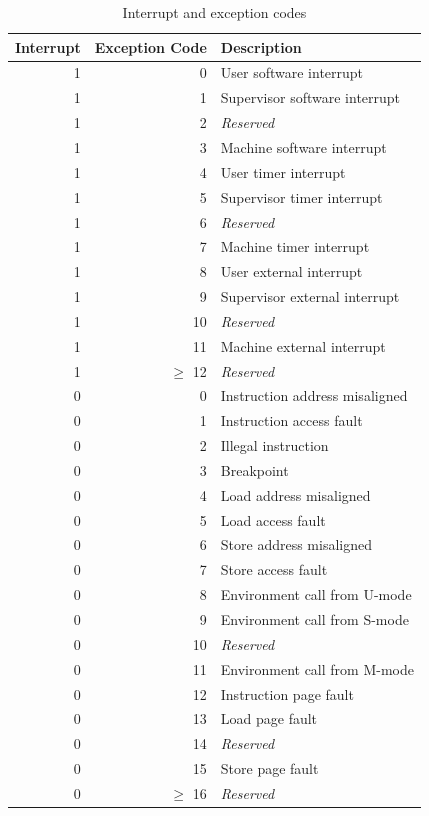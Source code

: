 \begin{table}
    \centering
    \begin{tabular}{| r | r | l |}
        \hline
        Interrupt & Exception Code & Description \\
        \hline
        1 & 0 & User software interrupt \\
        1 & 1 & Supervisor software interrupt \\
        1 & 2 & \textit{Reserved} \\
        1 & 3 & Machine software interrupt \\
        \hline
        1 & 4 & User timer interrupt \\
        1 & 5 & Supervisor timer interrupt \\
        1 & 6 & \textit{Reserved} \\
        1 & 7 & Machine timer interrupt \\
        \hline
        1 & 8 & User external interrupt \\
        1 & 9 & Supervisor external interrupt \\
        1 & 10 & \textit{Reserved} \\
        1 & 11 & Machine external interrupt \\
        \hline
        1 & $ \geq $ 12 & \textit{Reserved} \\
        \hline
        0 & 0 & Instruction address misaligned \\
        0 & 1 & Instruction access fault \\
        0 & 2 & Illegal instruction \\
        0 & 3 & Breakpoint \\
        0 & 4 & Load address misaligned \\
        0 & 5 & Load access fault \\
        0 & 6 & Store \textelp{} address misaligned \\
        0 & 7 & Store \textelp{} access fault \\
        0 & 8 & Environment call from U-mode \\
        0 & 9 & Environment call from S-mode \\
        0 & 10 & \textit{Reserved} \\
        0 & 11 & Environment call from M-mode \\
        0 & 12 & Instruction page fault \\
        0 & 13 & Load page fault \\
        0 & 14 & \textit{Reserved} \\
        0 & 15 & Store \textelp{} page fault \\
        0 & $ \geq $ 16 & \textit{Reserved} \\
        \hline
    \end{tabular}
    \caption{Interrupt and exception codes \cite{RiscVISAP}}
    \label{tbl:interrupt-exception-codes}
\end{table}

